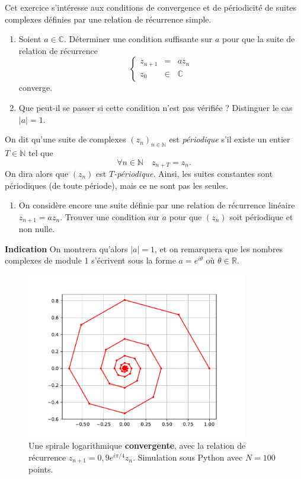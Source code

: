 \documentclass[12pt]{article}
\newcommand{\RR}{\mathbb R}
\newcommand{\CC}{\mathbb C}
\newcommand{\NN}{\mathbb N}
\theoremstyle{definition}
\theoremstyle{theorem}
\begin{document}
\begin{exer}
Cet exercice s'intéresse aux conditions de convergence et de périodicité de suites complexes définies par une relation de récurrence simple.
\begin{enumerate}
	\item Soient $a\in\CC$. Déterminer une condition suffisante sur $a$ pour que la suite de relation de récurrence
	\[
	\left\{
	\begin{array}{rll}
	z_{n+1} &= &az_n\\
	z_0 &\in &\CC
	\end{array}
	\right.
	\]
	converge.
	\item Que peut-il se passer si cette condition n'est pas vérifiée ? Distinguer le cas $|a| = 1$.
\end{enumerate}
On dit qu'une suite de complexes $(z_n)_{n\in\NN}$ est \textit{périodique} s'il existe un entier $T\in\NN$ tel que
\[
\forall n\in\NN\quad z_{n+T} = z_n.
\]
On dira alors que $(z_n)$ est \textit{$T$-périodique}. Ainsi, les suites constantes sont périodiques (de toute période), mais ce ne sont pas les seules.
\begin{enumerate}[resume]
	\item On considère encore une suite définie par une relation de récurrence linéaire $z_{n+1} = az_n$. Trouver une condition sur $a$ pour que $(z_n)$ soit périodique et non nulle.
\end{enumerate}

\noindent\textbf{Indication} On montrera qu'alors $|a| = 1$, et on remarquera que les nombres complexes de module 1 s'écrivent sous la forme $a = e^{i\theta}$ où $\theta\in\RR$.
\end{exer}

\begin{figure}[H]
	\centering
	\includegraphics[width=0.86\textwidth]{resources/logaro.pdf}
	\caption{Une spirale logarithmique \textbf{convergente}, avec la relation de récurrence $z_{n+1} = 0,\!9e^{i\pi/4}z_n$. Simulation sous Python avec $N=100$ points.}
\end{figure}
\end{document}
